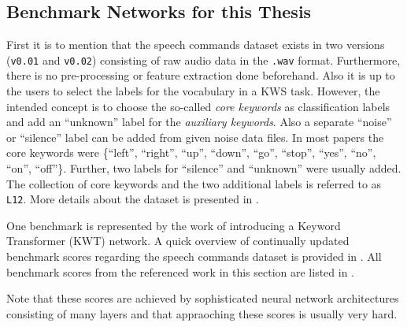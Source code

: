 \subsection{Benchmark Networks for this Thesis}\label{sec:prev_kws_benchmark}
First it is to mention that the speech commands dataset \cite{Warden2018} exists in two versions (\texttt{v0.01} and \texttt{v0.02}) consisting of raw audio data in the \texttt{.wav} format.
Furthermore, there is no pre-processing or feature extraction done beforehand.
Also it is up to the users to select the labels for the vocabulary in a KWS task.
However, the intended concept is to choose the so-called \emph{core keywords} as classification labels and add an \enquote{unknown} label for the \emph{auxiliary keywords}.
Also a separate \enquote{noise} or \enquote{silence} label can be added from given noise data files.
In most papers the core keywords were \{\enquote{left},  \enquote{right}, \enquote{up}, \enquote{down}, \enquote{go}, \enquote{stop}, \enquote{yes}, \enquote{no}, \enquote{on}, \enquote{off}\}.
Further, two labels for \enquote{silence} and \enquote{unknown} were usually added.
The collection of core keywords and the two additional labels is referred to as \texttt{L12}.
More details about the dataset is presented in .

One benchmark is represented by the work of \cite{Berg2021} introducing a Keyword Transformer (KWT) network.
A quick overview of continually updated benchmark scores regarding the speech commands dataset is provided in \cite{PaperswithcodeKWS}.
All benchmark scores from the referenced work in this section are listed in .

Note that these scores are achieved by sophisticated neural network architectures consisting of many layers and that appraoching these scores is usually very hard.